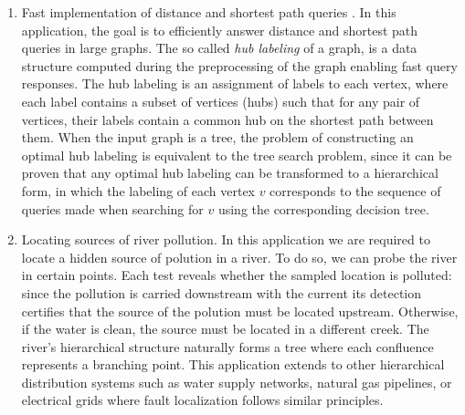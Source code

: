 \begin{enumerate}
        \item Fast implementation of distance and shortest path queries \cite{Angelidakis2018ShortestPQ}. In this application, the goal is to efficiently answer distance and shortest path queries in large graphs. The so called \textit{hub labeling} of a graph, is a data structure computed during the preprocessing of the graph enabling fast query responses. The hub labeling is an assignment of labels to each vertex, where each label contains a subset of vertices (hubs) such that for any pair of vertices, their labels contain a common hub on the shortest path between them. When the input graph is a tree, the problem of constructing an optimal hub labeling is equivalent to the tree search problem, since it can be proven that any optimal hub labeling can be transformed to a hierarchical form, in which the labeling of each vertex $v$ corresponds to the sequence of queries made when searching for $v$ using the corresponding decision tree.
    \item Locating sources of river pollution. In this application we are required to locate a hidden source of polution in a river. To do so, we can probe the river in certain points. Each test reveals whether the sampled location is polluted: since the pollution is carried downstream with the current its detection certifies that the source of the polution must be located upstream. Otherwise, if the water is clean, the source must be located in a different creek. The river's hierarchical structure naturally forms a tree where each confluence represents a branching point. This application extends to other hierarchical distribution systems such as water supply networks, natural gas pipelines, or electrical grids where fault localization follows similar principles.
\end{enumerate}

